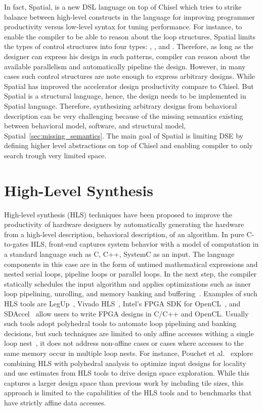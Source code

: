 In fact, Spatial, is a new DSL language on top of Chisel which tries to strike balance between high-level constructs in the language for improving programmer productivity versus low-level syntax for tuning performance. 
For instance, to enable the compiler to be able to reason about the loop structures, Spatial limits the types of control structures into four types: , ,  and .
Therefore, as long as the designer can express his design in such patterns, compiler can reason about the available parallelism and automatically pipeline the design.
However, in many cases such control structures are note enough to express arbitrary designs.
While Spatial has improved the accelerator design productivity compare to Chisel.
But Spatial is a structural language, hence, the design needs to be implemented in Spatial language.
Therefore, synthesizing arbitrary designs from behavioral description can be very challenging because of the missing semantics existing between behavioral model, software, and structural model, Spatial~\ref{sec:missing_semantics}.
The main goal of Spatial is limiting DSE by defining higher level abstractions on top of Chisel and enabling compiler to only search trough very limited space.

\section{High-Level Synthesis}

High-level synthesis (HLS) techniques have been proposed to improve the productivity of hardware designers by automatically generating the hardware from a high-level description, behavioral description, of an algorithm.
In pure C-to-gates HLS, front-end captures system behavior with a model of computation in a standard language such as C, C++, SystemC as an input. The language components in this case are in the form of untimed mathematical expressions and nested serial loops, pipeline loops or parallel loops.
In the next step, the compiler statically schedules the input algorithm and applies optimizations such as inner loop pipelining, unrolling, and memory banking and buffering~\cite{chung_micro_2010, lee_1989_new, paulin_1989_force}.
Examples of such HLS tools are LegUp~\cite{canis_2011_legup}, Vivado HLS~\cite{vivadohls}, Intel’s FPGA SDK for OpenCL~\cite{opencl_sdk}, and SDAccel~\cite{sdaccel} allow users to write FPGA designs in C/C++ and OpenCL.
Usually such tools adopt polyhedral tools to automate loop pipelining and banking decisions, but such techniques are limited to only affine accesses withing a single loop nest~\cite{wang_2014_theory}, it does not address non-affine cases or cases where accesses to the same memory occur in multiple loop nests.
For instance, Pouchet et al.~\cite{pouchet_2013_polyhedral}  explore combining HLS with polyhedral analysis to optimize input designs for locality and use estimates from HLS tools to drive design space exploration.
While this captures a larger design space than previous work by including tile sizes, this approach is limited to the capabilities of the HLS tools and to benchmarks that have strictly affine data accesses.

